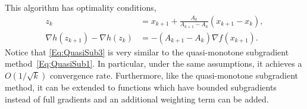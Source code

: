 \documentclass[11pt]{article}
\theoremstyle{plain}
\begin{document}
\noindent This algorithm has optimality conditions,
\begin{subequations}\label{Eq:QuasiSub3}
\begin{align}
z_{k} &= x_{k+1} + \frac{A_{k}}{A_{k+1} -A_{k}} (x_{k+1} - x_k),\label{Eq:ZSeqMethod2}\\%
\nabla h(z_{k+1}) -\nabla h(z_k) &= -(A_{k+1} - A_{k})\nabla f(x_{k+1}).\label{Eq:XSeqMethod2}
\end{align} 
\end{subequations}
Notice that \eqref{Eq:QuasiSub3} is very similar to the quasi-monotone subgradient method~\eqref{Eq:QuasiSub1}. In particular, under the same assumptions, it achieves a $O(1/\sqrt{k})$ convergence rate. Furthermore, like the quasi-monotone subgradient method, it can be extended to functions which have bounded subgradients instead of full gradients and an additional weighting term can be added.

\end{document}
